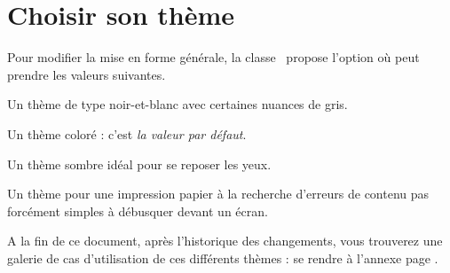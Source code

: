 \documentclass{tutodoc}
\begin{document}
\section{Choisir son thème}

Pour modifier la mise en forme générale, la classe \thisproj\ propose l'option  où  peut prendre les valeurs suivantes.

\begin{center}
    \begin{minipage}{.925\linewidth}
        \begin{description}[wide]
            \item[bw]
            Un thème de type noir-et-blanc avec certaines nuances de gris.
        
            \item[color]
            Un thème coloré : c'est \emph{la valeur par défaut}.
        
            \item[dark]
            Un thème sombre idéal pour se reposer les yeux.
        
            \item[draft]
            Un thème pour une impression papier à la recherche d'erreurs de contenu pas forcément simples à débusquer devant un écran.
        \end{description}
    \end{minipage}
\end{center}


\begin{tdocnote}
    A la fin de ce document, après l'historique des changements, vous trouverez une galerie de cas d'utilisation de ces différents thèmes : se rendre à l'annexe page \pageref{tutodoc-theme-gallery}.
\end{tdocnote}
\end{document}
